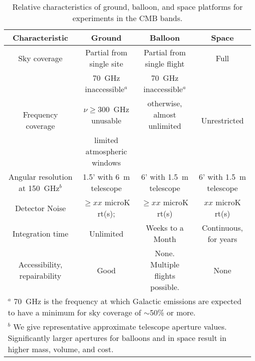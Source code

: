 \documentclass[PICOReport.tex]{subfiles}
\begin{document}
\begin{table}%
\begin{adjustbox}{width=1\textwidth,center}
\begin{tabular}{|c|c|c|c|}
\hline
\bf{Characteristic} & {\bf Ground} & {\bf Balloon} & {\bf Space}  \\ \hline
Sky coverage & Partial from single site & Partial from single flight & Full \\ \hline
\multirow{3}{*}{Frequency coverage} & 70~GHz inaccessible$^{a}$    & 70~GHz inaccessible$^{a}$       & \multirow{3}{*}{Unrestricted} \\  
                                                           &  $\nu \ge 300$~GHz unusable   &    otherwise, almost unlimited   &                                            \\  
                                                           &     limited atmospheric windows  &                                      &                                           \\ \hline
  Angular resolution at 150~GHz$^{b}$  & 1.5' with 6~m telescope & 6' with 1.5~m telescope & 6' with 1.5~m telescope \\ \hline
   Detector Noise                                    & $\ge xx$ microK rt(s);  & $\ge xx$ microK rt(s)  &  $ xx$ microK rt(s) \\  \hline
Integration time                                   & Unlimited & Weeks to a Month & Continuous, for years \\ \hline
Accessibility, repairability                    & Good & None.  Multiple flights possible.& None \\
\hline
\multicolumn{4}{l}{$^{a}$ 70~GHz is the frequency at which Galactic emissions are expected to have a minimum for sky coverage of $\sim$50\% or more. } \\
\multicolumn{4}{l}{$^{b}$ We give representative approximate telescope aperture values. Significantly larger apertures for balloons and in space result in higher mass, volume, and cost.  }
\end{tabular}
\end{adjustbox}
\vspace{-0.13in}
\caption{ \small \setlength{\baselineskip}{0.95\baselineskip}
Relative characteristics of ground, balloon, and space platforms for experiments in the CMB bands.\label{tab:comparison} }
\vspace{-0.05in}
\end{table}
\end{document}
